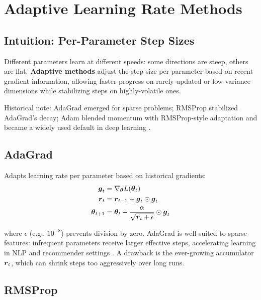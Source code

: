 
\section{Adaptive Learning Rate Methods }
\label{sec:adaptive-methods}

\subsection{Intuition: Per-Parameter Step Sizes}

Different parameters learn at different speeds: some directions are steep, others are flat. \textbf{Adaptive methods} adjust the step size per parameter based on recent gradient information, allowing faster progress on rarely-updated or low-variance dimensions while stabilizing steps on highly-volatile ones.

Historical note: AdaGrad emerged for sparse problems; RMSProp stabilized AdaGrad's decay; Adam blended momentum with RMSProp-style adaptation and became a widely used default in deep learning \cite{Duchi2011,Tieleman2012,Kingma2014,GoodfellowEtAl2016}.

\subsection{AdaGrad}

Adapts learning rate per parameter based on historical gradients:
\begin{align}
\boldsymbol{g}_t &= \nabla_{\boldsymbol{\theta}} L(\boldsymbol{\theta}_t) \\
\boldsymbol{r}_t &= \boldsymbol{r}_{t-1} + \boldsymbol{g}_t \odot \boldsymbol{g}_t \\
\boldsymbol{\theta}_{t+1} &= \boldsymbol{\theta}_t - \frac{\alpha}{\sqrt{\boldsymbol{r}_t + \epsilon}} \odot \boldsymbol{g}_t
\end{align}

where $\epsilon$ (e.g., $10^{-8}$) prevents division by zero. AdaGrad is well-suited to sparse features: infrequent parameters receive larger effective steps, accelerating learning in NLP and recommender settings \cite{Duchi2011,WebOptimizationDLBook,D2LChapterOptimization}. A drawback is the ever-growing accumulator \(\boldsymbol{r}_t\), which can shrink steps too aggressively over long runs.

\subsection{RMSProp}

